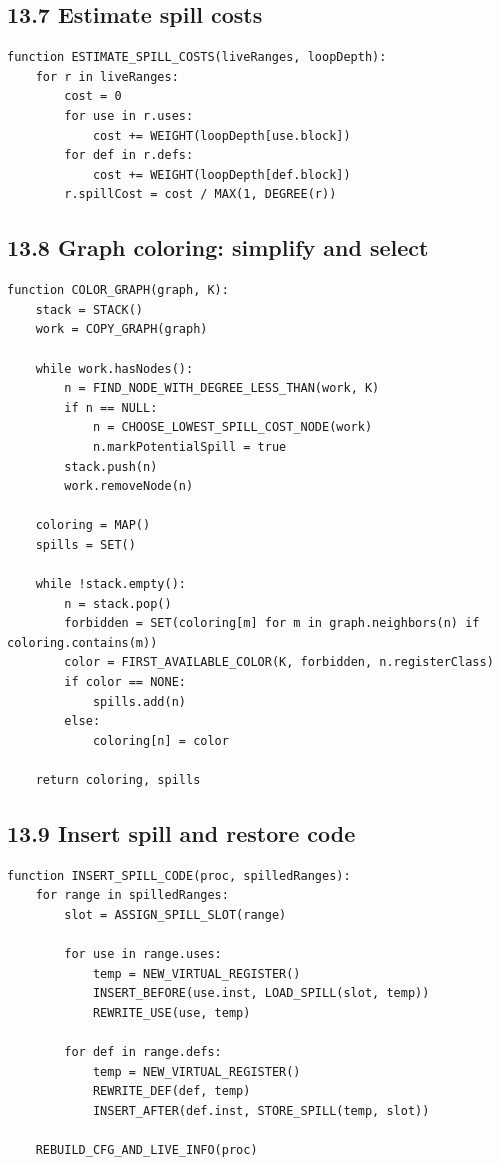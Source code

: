 \documentclass[10pt,letterpaper]{article}
\begin{document}
\subsection*{13.7 Estimate spill costs}

\begin{verbatim}
function ESTIMATE_SPILL_COSTS(liveRanges, loopDepth):
    for r in liveRanges:
        cost = 0
        for use in r.uses:
            cost += WEIGHT(loopDepth[use.block])
        for def in r.defs:
            cost += WEIGHT(loopDepth[def.block])
        r.spillCost = cost / MAX(1, DEGREE(r))
\end{verbatim}

\subsection*{13.8 Graph coloring: simplify and select}

\begin{verbatim}
function COLOR_GRAPH(graph, K):
    stack = STACK()
    work = COPY_GRAPH(graph)

    while work.hasNodes():
        n = FIND_NODE_WITH_DEGREE_LESS_THAN(work, K)
        if n == NULL:
            n = CHOOSE_LOWEST_SPILL_COST_NODE(work)
            n.markPotentialSpill = true
        stack.push(n)
        work.removeNode(n)

    coloring = MAP()
    spills = SET()

    while !stack.empty():
        n = stack.pop()
        forbidden = SET(coloring[m] for m in graph.neighbors(n) if coloring.contains(m))
        color = FIRST_AVAILABLE_COLOR(K, forbidden, n.registerClass)
        if color == NONE:
            spills.add(n)
        else:
            coloring[n] = color

    return coloring, spills
\end{verbatim}

\subsection*{13.9 Insert spill and restore code}

\begin{verbatim}
function INSERT_SPILL_CODE(proc, spilledRanges):
    for range in spilledRanges:
        slot = ASSIGN_SPILL_SLOT(range)

        for use in range.uses:
            temp = NEW_VIRTUAL_REGISTER()
            INSERT_BEFORE(use.inst, LOAD_SPILL(slot, temp))
            REWRITE_USE(use, temp)

        for def in range.defs:
            temp = NEW_VIRTUAL_REGISTER()
            REWRITE_DEF(def, temp)
            INSERT_AFTER(def.inst, STORE_SPILL(temp, slot))

    REBUILD_CFG_AND_LIVE_INFO(proc)
\end{verbatim}
\end{document}
